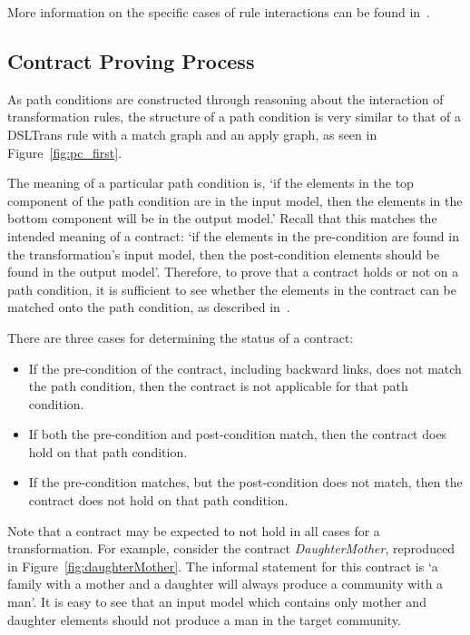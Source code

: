 More information on the specific cases of rule interactions can be found in~\cite{Oakes2016}.

\subsection{Contract Proving Process}
\label{subsub:contract_proving}

As path conditions are constructed through reasoning about the interaction of
transformation rules, the structure of a path condition is very similar to that
of a DSLTrans rule with a match graph and an apply graph, as seen in
Figure~\ref{fig:pc_first}.

The meaning of a particular path condition is, `if the elements in the top component of the path condition are in the input model, then the elements in the bottom component will be in the output model.' Recall that this matches the intended meaning of a contract: `if the elements in
the pre-condition are found in the transformation's input model, then the
post-condition elements should be found in the output model'. Therefore, to prove that a
contract holds or not on a path condition, it is sufficient to see whether the
elements in the contract can be matched onto the path condition, as described
in~\cite{Lucio2014}.


There are three cases for determining the status of a contract:
\begin{itemize}
\item If the pre-condition of the contract, including backward links, does not match the path condition, then the contract is not applicable for that path condition.
\item If both the pre-condition and post-condition match, then the contract does hold on that path condition.
\item If the pre-condition matches, but the post-condition does not match, then the contract does not hold on that path condition.
\end{itemize}

Note that a contract may be expected to not hold in all cases for a
transformation. For example, consider the contract \textit{Daughter\-Mother},
reproduced in Figure~\ref{fig:daughterMother}. The informal statement for this contract is `a family with a mother and a
daughter will always produce a community with a man'.  It is easy to see that an input model which contains only mother and
 daughter elements should not produce a man in the target community.

